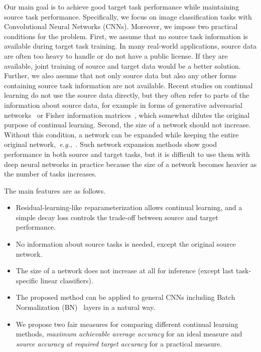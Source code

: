 \documentclass[letterpaper]{article}
\begin{document}
Our main goal is to achieve good target task performance while maintaining source task performance. Specifically, we focus on image classification tasks with Convolutional Neural Networks (CNNs). Moreover, we impose two practical conditions for the problem.
First, we assume that no source task information is available during target task training.
In many real-world applications, source data are often too heavy to handle or do not have a public license.
If they are available, joint training of source and target data would be a better solution. %
Further, we also assume that not only source data but also any other forms containing source task information are not available.
Recent studies on continual learning do not use the source data directly, but they often refer to parts of the information about source data, for example in forms of generative adversarial networks~\cite{shin2017continual} or Fisher information matrices~\cite{kirkpatrick2017overcoming,ritter2018online}, which somewhat dilutes the original purpose of continual learning.
Second, the size of a network should not increase. Without this condition, a network can be expanded while keeping the entire original network,~\textit{e.g.},~\cite{terekhov2015knowledge,rusu2016progressive}.
Such network expansion methods show good performance in both source and target tasks, but it is difficult to use them with deep neural networks in practice because the size of a network becomes heavier as the number of tasks increases.


The main features are as follows.
\begin{itemize}
\item Residual-learning-like reparameterization allows continual learning, and a simple decay loss controls the trade-off between source and target performance.
\item No information about source tasks is needed, except the original source network.
\item The size of a network does not increase at all for inference (except last task-specific linear classifiers).
\item The proposed method can be applied to general CNNs including Batch Normalization (BN)~\cite{ioffe2015batch} layers in a natural way.
\item We propose two fair measures for comparing different continual learning methods, \textit{maximum achievable average accuracy} for an ideal measure and \textit{source accuracy at required target accuracy} for a practical measure.
\end{itemize}
\end{document}
